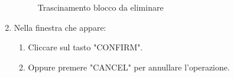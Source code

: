 \begin{enumerate}
\begin{figure}[!ht]
		\centering
		\caption{Trascinamento blocco da eliminare}
	\end{figure}
	\newpage
	\item Nella finestra che appare:
	\begin{enumerate}
		\item Cliccare sul tasto "CONFIRM".
		\item Oppure premere "CANCEL" per annullare l'operazione.
	\end{enumerate}
	\begin{figure}[!ht]
		\centering

\end{figure}
\end{enumerate}
